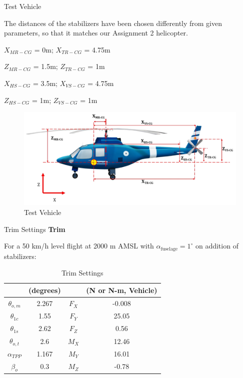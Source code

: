\documentclass{beamer}
\begin{document}
\begin{frame}{Test Vehicle}

  The distances of the stabilizers have been chosen differently from given parameters, so that it matches our Assignment 2 helicopter.

\begin{center}
    $X_{MR-CG}$ = 0m; $X_{TR-CG}$ = 4.75m
    
    $Z_{MR-CG}$ = 1.5m; $Z_{TR-CG}$ = 1m

    $X_{HS-CG}$ = 3.5m; $X_{VS-CG}$ = 4.75m

    $Z_{HS-CG}$ = 1m; $Z_{VS-CG}$ = 1m
\end{center}

\begin{figure}
    \centering
    \includegraphics[width=0.75\linewidth]{../images/test_helicopter.png}
    \caption{Test Vehicle}
\end{figure}
\end{frame}

\begin{frame}{Trim Settings}
    \textbf{Trim}
    
  For a 50 km/h level flight at 2000 m AMSL with $\alpha_\text{fuselage} = 1^\circ$ on addition of stabilizers:
  \begin{table}[ht]
      \centering
      \renewcommand{\arraystretch}{1.4} %
      \setlength{\tabcolsep}{12pt} %
      \begin{tabular}{|c|c|c|c|}
          \hline
          &(degrees)  & &(N or N-m, Vehicle)  \\
          \hline
          \textbf{$\theta_{o,m}$} & 2.267 & \textbf{$F_X$} & -0.008 \\ 
          \hline
          \textbf{$\theta_{1c}$} & 1.55 & \textbf{$F_Y$} & 25.05 \\ 
          \hline
          \textbf{$\theta_{1s}$} & 2.62 & \textbf{$F_Z$} & 0.56 \\ 
          \hline
          \textbf{$\theta_{o,t}$} & 2.6 & \textbf{$M_X$} & 12.46 \\ 
          \hline
          \textbf{$\alpha_{TPP}$} & 1.167 & \textbf{$M_Y$} & 16.01 \\ 
          \hline
          \textbf{$\beta_{o}$} & 0.3 & \textbf{$M_Z$} & -0.78 \\ 
          \hline
      \end{tabular}
      \caption{Trim Settings}
      \label{tab:trim_settings}
  \end{table}
  
  \end{frame}
\end{document}
